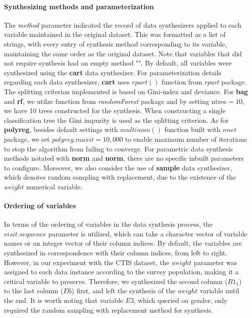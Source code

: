 \paragraph{Synthesizing methods and parameterization}
The \textit{method} parameter indicated the record of data synthesizers applied to each variable maintained in the original dataset. This was formatted as a list of strings, with every entry of synthesis method corresponding to its variable, maintaining the same order as the original dataset. Note that variables that did not require synthesis had an empty method "". By default, all variables were synthesized using the \textbf{cart} data synthesizer. For parameterization details regarding each data synthesizer, \textbf{cart} uses $rpart()$ function from \textit{rpart} package. The splitting criterion implemented is based on Gini-index and deviance. For \textbf{bag} and \textbf{rf}, we utilze function from \textit{randomForest} package and by setting $\text{ntree}=10$, we have 10 trees constructed for the synthesis. When constructing a single classification tree the Gini impurity is used as the splitting criterion. As for \textbf{polyreg}, besides default settings with $multinom()$ function built with $nnet$ package, we set $polyreg.maxit=10,000$ to enable maximum number of iterations to stop the algorithm from failing to converge. For parametric data synthesis methods notated with \textbf{norm} and \textbf{norm}, there are no specific inbuilt parameters to configure. Moreover, we also consider the use of \textbf{sample} data synthesizer, which denotes random sampling with replacement, due to the existence of the $weight$ numerical variable.

\paragraph{Ordering of variables}
In terms of the ordering of variables in the data synthesis process, the $visit.sequence$ parameter is utilized, which can take a character vector of variable names or an integer vector of their column indices. By default, the variables are synthesized in correspondence with their column indices, from left to right. However, in our experiment with the CTIS dataset, the $weight$ parameter was assigned to each data instance according to the survey population, making it a critical variable to preserve. Therefore, we synthesized the second column ($B1_1$) to the last column ($E6$) first, and left the synthesis of the $weight$ variable until the end. It is worth noting that variable $E3$, which queried on gender, only required the random sampling with replacement method for synthesis.

